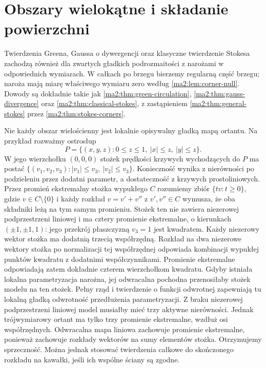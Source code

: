 \section{Obszary wielokątne i składanie powierzchni}

Twierdzenia Greena, Gaussa o dywergencji
oraz klasyczne twierdzenie Stokesa zachodzą
również dla zwartych gładkich podrozmaitości
z narożami w odpowiednich wymiarach.
W całkach po brzegu bierzemy regularną
część brzegu; naroża mają miarę właściwego
wymiaru zero według \ref{ma2:lem:corner-null}.
Dowody są dokładnie takie jak
\ref{ma2:thm:green-circulation},
\ref{ma2:thm:gauss-divergence} oraz
\ref{ma2:thm:classical-stokes}, z zastąpieniem
\ref{ma2:thm:general-stokes}
przez \ref{ma2:thm:stokes-corners}.

Nie każdy obszar wielościenny jest lokalnie
opisywalny gładką mapą ortantu.
Na przykład rozważmy ostrosłup
\[
 P=\{(x,y,z):0\le z\le1,\ |x|\le z,\ |y|\le z\}.
\]
W jego wierzchołku $(0,0,0)$ stożek prędkości
krzywych wychodzących do $P$ ma postać
$\{(v_1,v_2,v_3):|v_1|\le v_3,\ |v_2|\le v_3\}$.
Konieczność wynika z nierówności po podzieleniu
przez dodatni parametr, a dostateczność
z krzywych prostoliniowych.
Przez promień ekstremalny stożka wypukłego
$C$ rozumiemy zbiór $\{tv:t\ge0\}$, gdzie
$v\in C\setminus\{0\}$ i każdy rozkład $v=v'+v''$
z $v',v''\in C$ wymusza, że oba składniki
leżą na tym samym promieniu.
Stożek ten nie zawiera niezerowej podprzestrzeni
liniowej i ma cztery promienie ekstremalne,
o kierunkach $(\pm1,\pm1,1)$:
jego przekrój płaszczyzną $v_3=1$ jest kwadratem.
Każdy niezerowy wektor stożka ma dodatnią
trzecią współrzędną. Rozkład na dwa niezerowe
wektory stożka po normalizacji tej współrzędnej
odpowiada kombinacji wypukłej punktów kwadratu
z dodatnimi współczynnikami.
Promienie ekstremalne odpowiadają zatem
dokładnie czterem wierzchołkom kwadratu. Gdyby istniała lokalna
parametryzacja narożna, jej odwracalna pochodna
przenosiłaby stożek modelu na ten stożek.
Pełny rząd i twierdzenie o funkcji odwrotnej
zapewniają tu lokalną gładką odwrotność
przedłużenia parametryzacji.
Z braku niezerowej podprzestrzeni liniowej
model musiałby mieć trzy aktywne nierówności.
Jednak trójwymiarowy ortant ma tylko trzy
promienie ekstremalne, wzdłuż osi współrzędnych.
Odwracalna mapa liniowa zachowuje promienie
ekstremalne, ponieważ zachowuje rozkłady
wektorów na sumy elementów stożka.
Otrzymujemy sprzeczność.
Można jednak stosować twierdzenia całkowe
do skończonego rozkładu na kawałki,
jeśli ich wspólne ściany są zgodne.

